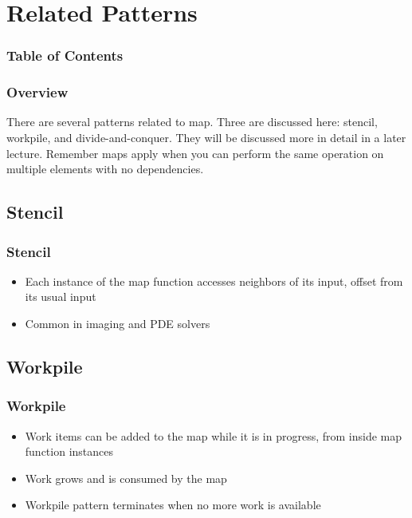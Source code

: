 \documentclass[xcolor=dvipsnames]{beamer}
\begin{document}
\section{Related Patterns} 

	\begin{frame} \frametitle{Table of Contents}
		\tableofcontents[currentsection]
	\end{frame} 
	
    \begin{frame} \frametitle{Overview}
        There are several patterns related to map. Three are discussed here:
        stencil, workpile, and divide-and-conquer. They will be discussed 
        more in detail in a later lecture. Remember maps apply when you can 
        perform the same operation on multiple elements with no dependencies.
    \end{frame}
	
	\subsection{Stencil}
        \begin{frame} \frametitle{Stencil}
            \begin{itemize}
                \item Each instance of the map function accesses neighbors of 
                its input, offset from its usual input
                \item Common in imaging and PDE solvers
            \end{itemize}
        \end{frame}

	\subsection{Workpile}
		\begin{frame} \frametitle{Workpile}
			\begin{itemize}
				\item Work items can be added to the map while it is in 
                progress, from inside map function instances
				\item Work grows and is consumed by the map
				\item Workpile pattern terminates when no more work is
                available 
			\end{itemize}
	
		\end{frame}
		
\end{document}
